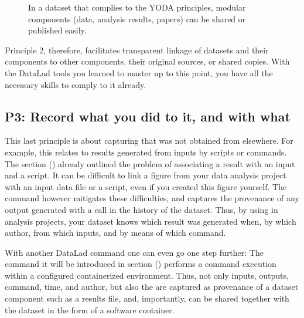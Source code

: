 \begin{figure}[tbp]
\centering
\capstart

\noindent{}
\caption{In a dataset that complies to the YODA principles, modular components
(data, analysis results, papers) can be shared or published easily.}\label{\detokenize{basics/101-127-yoda:id7}}\label{\detokenize{basics/101-127-yoda:fig-yodads}}\end{figure}

\sphinxAtStartPar
Principle 2, therefore, facilitates transparent linkage of datasets and their
components to other components, their original sources, or shared copies.
With the DataLad tools you learned to master up to this point,
you have all the necessary skills to comply to it already.


\subsection{P3: Record what you did to it, and with what}
\label{\detokenize{basics/101-127-yoda:p3-record-what-you-did-to-it-and-with-what}}\label{\detokenize{basics/101-127-yoda:p3}}
\sphinxAtStartPar
This last principle is about capturing  that was not obtained from elsewhere. For example,
this relates to results generated from inputs by scripts or commands.
The section {\hyperref[\detokenize{basics/101-108-run:run}]{}} () already outlined the problem of associating
a result with an input and a script. It can be difficult to link a
figure from your data analysis project with an input data file or a
script, even if you created this figure yourself.
The  command however mitigates these difficulties,
and captures the provenance of any output generated with a
 call in the history of the dataset. Thus, by using
 in analysis projects, your dataset knows
which result was generated when, by which author, from which inputs,
and by means of which command.

\sphinxAtStartPar
With another DataLad command one can even go one step further:
The command  \sphinxhyphen{} it will be introduced in
section {\hyperref[\detokenize{basics/101-133-containersrun:containersrun}]{}} () \sphinxhyphen{} performs a command execution within
a configured containerized environment. Thus, not only inputs,
outputs, command, time, and author, but also the 
are captured as provenance of a dataset component such as a results file,
and, importantly, can be shared together with the dataset in the
form of a software container.

